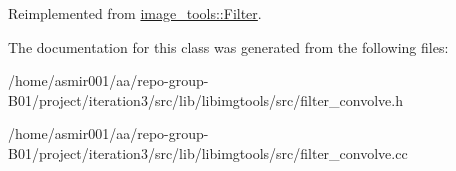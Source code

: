 Reimplemented from \hyperlink{classimage__tools_1_1Filter_afd5d1be5736e343077d331896d4130d9}{image\+\_\+tools\+::\+Filter}.



The documentation for this class was generated from the following files\+:\begin{DoxyCompactItemize}
\item 
/home/asmir001/aa/repo-\/group-\/\+B01/project/iteration3/src/lib/libimgtools/src/filter\+\_\+convolve.\+h\item 
/home/asmir001/aa/repo-\/group-\/\+B01/project/iteration3/src/lib/libimgtools/src/filter\+\_\+convolve.\+cc\end{DoxyCompactItemize}
